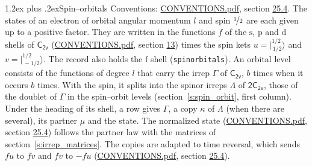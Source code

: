 \documentclass[10pt,a4paper]{article}
\makeatletter
\renewcommand\section{\@startsection{section}{1}{\z@}{-3ex plus -1ex minus -.2ex}%
  {1.2ex plus .2ex}{\normalfont\large\sffamily\bfseries\color{parttitle}}}
\numberwithin{equation}{section}
\newcommand{\grp}[1]{\mathsf{#1}}
\newcommand{\orbital}[1]{\mathrm{#1}}
\newcommand{\mult}{\kappa}
\newcommand{\intx}{\mu}
\newcommand{\jm}[2]{\bigl\lvert{}^{#1}_{\,#2}\bigr\rangle}
\makeatother
\begin{document}
\section{Spin--orbitals}\label{s:spin_orbitals}
Conventions: \href{../../CONVENTIONS.pdf}{CONVENTIONS.pdf}, section \href{../../CONVENTIONS.pdf\#conv.25.4}{25.4}.
\leavevmode\label{n:index.orbital.l}The states of an electron of orbital angular momentum $l$ and spin $\nicefrac{1}{2}$ are each given up to a positive factor. \label{n:local.spinor.uv}\label{n:local.function.f}They are written in the functions $f$ of the $\orbital{s}$, $\orbital{p}$ and $\orbital{d}$ shells of \href{../../../rotation/data/pdf/C2v.pdf}{$\grp{C_{2v}}$} (\href{../../CONVENTIONS.pdf}{CONVENTIONS.pdf}, section \href{../../../rotation/CONVENTIONS.pdf\#conv.13}{13}) times the spin kets $u = \jm{1/2}{1/2}$ and $v = \jm{1/2}{-1/2}$. The record also holds the $\orbital{f}$ shell (\texttt{spinorbitals}). An orbital level consists of the functions of degree $l$ that carry the irrep $\Gamma$ of \href{../../../rotation/data/pdf/C2v.pdf}{$\grp{C_{2v}}$}, $b$ times when it occurs $b$ times. With the spin, it splits into the spinor irreps $\Lambda$ of $\grp{2C_{2v}}$, those of the doublet of $\Gamma$ in the spin--orbit levels (section~\ref{s:spin_orbit}, first column). \label{n:head.state}Under the heading of its shell, a row gives $\Gamma$, a copy $\mult$ of $\Lambda$ (when there are several), its partner $\intx$ and the state. The normalized state (\href{../../CONVENTIONS.pdf}{CONVENTIONS.pdf}, section \href{../../CONVENTIONS.pdf\#conv.25.4}{25.4}) follows the partner law with the matrices of section~\ref{s:irrep_matrices}. The copies are adapted to time reversal, which sends $f u$ to $f v$ and $f v$ to $-f u$ (\href{../../CONVENTIONS.pdf}{CONVENTIONS.pdf}, section \href{../../CONVENTIONS.pdf\#conv.25.4}{25.4}).
\end{document}
